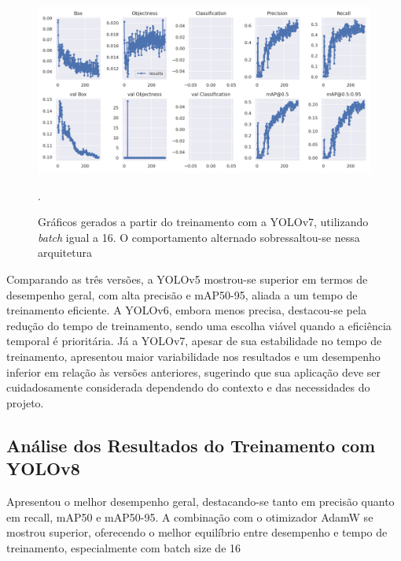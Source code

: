 \begin{figure}[!h]
    \centering
    \begin{minipage}{1\linewidth}
    \centering
    \captionsetup{justification=centering,margin=0.5cm,font=small}
    \includegraphics[width=1\linewidth]{img/cap6/results-yolov7-batch-16.png}
    \caption{Gráficos gerados a partir do treinamento com a YOLOv7, utilizando \textit{batch} igual a 16. O comportamento alternado sobressaltou-se nessa arquitetura}.
    \label{fig:yolov5batch16}
    \end{minipage}
\end{figure}

Comparando as três versões, a YOLOv5 mostrou-se superior em termos de desempenho geral, com alta precisão e mAP50-95, aliada a um tempo de treinamento eficiente. A YOLOv6, embora menos precisa, destacou-se pela redução do tempo de treinamento, sendo uma escolha viável quando a eficiência temporal é prioritária. Já a YOLOv7, apesar de sua estabilidade no tempo de treinamento, apresentou maior variabilidade nos resultados e um desempenho inferior em relação às versões anteriores, sugerindo que sua aplicação deve ser cuidadosamente considerada dependendo do contexto e das necessidades do projeto.

\subsection{Análise dos Resultados do Treinamento com YOLOv8}

Apresentou o melhor desempenho geral, destacando-se tanto em precisão quanto em recall, mAP50 e mAP50-95. A combinação com o otimizador AdamW se mostrou superior, oferecendo o melhor equilíbrio entre desempenho e tempo de treinamento, especialmente com batch size de 16

